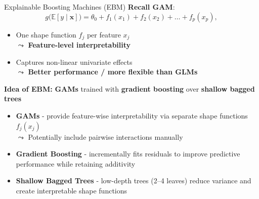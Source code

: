 \documentclass[11pt,compress,t,notes=noshow, aspectratio=169, xcolor=table]{beamer}
\begin{document}
\begin{frame}{Explainable Boosting Machines (EBM)}
\textbf{Recall GAM}: 
$$
g\big(\mathbb{E}[y \mid \mathbf{x}]\big) = \theta_0 + f_1(x_{1}) + f_2(x_{2}) + \ldots + f_p(x_{p}),
$$

\begin{itemize}
    \item One shape function $f_j$ per feature $x_j$\\ $\leadsto$ \textbf{Feature-level interpretability}
    \item Captures non-linear univariate effects\\ $\leadsto$ \textbf{Better performance / more flexible than GLMs}
\end{itemize}

\medskip

\textbf{Idea of EBM:} \textbf{GAMs} trained with \textbf{gradient boosting} over \textbf{shallow bagged trees}
\begin{itemize}
    \item \textbf{GAMs} - provide feature-wise interpretability via separate shape functions $f_j(x_j)$\\
    $\leadsto$ Potentially include pairwise interactions manually
    \item \textbf{Gradient Boosting} - incrementally fits residuals to improve predictive performance while retaining additivity
    \item \textbf{Shallow Bagged Trees} - low-depth trees (2–4 leaves) reduce variance and create interpretable shape functions
\end{itemize}



\end{frame}
\end{document}

